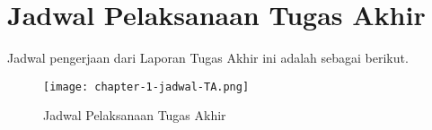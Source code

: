 
\section{Jadwal Pelaksanaan Tugas Akhir}

Jadwal pengerjaan dari Laporan Tugas Akhir ini adalah sebagai berikut.

\begin{figure}[h]
  \centering
  \texttt{[image: chapter-1-jadwal-TA.png]}
  \caption{Jadwal Pelaksanaan Tugas Akhir}
\end{figure}
